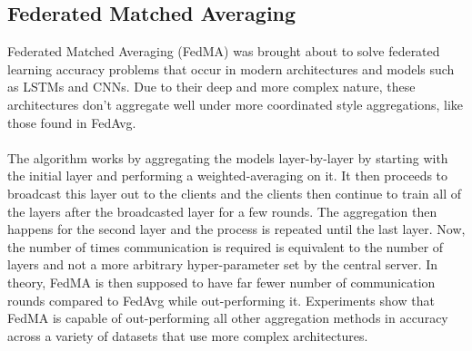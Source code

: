 \subsection{Federated Matched Averaging}
Federated Matched Averaging (FedMA) \cite{fedma} was brought about to solve federated learning accuracy problems that occur in modern architectures and models such as LSTMs and CNNs.
Due to their deep and more complex nature, these architectures don't aggregate well under more coordinated style aggregations, like those found in FedAvg.
\\ \\
The algorithm works by aggregating the models layer-by-layer by starting with the initial layer and performing a weighted-averaging on it.
It then proceeds to broadcast this layer out to the clients and the clients then continue to train all of the layers after the broadcasted layer for a few rounds.
The aggregation then happens for the second layer and the process is repeated until the last layer.
Now, the number of times communication is required is equivalent to the number of layers and not a more arbitrary hyper-parameter set by the central server.
In theory, FedMA is then supposed to have far fewer number of communication rounds compared to FedAvg while out-performing it.
Experiments show \cite{fedma} that FedMA is capable of out-performing all other aggregation methods in accuracy across a variety of datasets that use more complex architectures.


